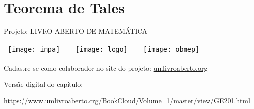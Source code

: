 \ifnum{}
\renewcommand\chapterillustration{abertura-tales}
\else
\renewcommand\chapterillustration{abertura-tales-professor}
\fi
\renewcommand\chapterwhat{São estudados o significado de um teorema
com sua hipótese e tese, o Teorema de Tales, sua recíproca, as projeções paralelas e aplicações.}
\renewcommand\chapterbecause{O capítulo contém uma ferramenta útil para resolver situações que envolvem retas paralelas. Além disso, o teorema de Tales será usado para para desenvolver o conceito de semelhança de triângulos, que é um dos instrumentos necessários para compreender o mundo real. A semelhança, por sua vez, permite a obtenção de diversas propriedades métricas das figuras geométricas, tanto planas como espaciais.}


\chapter{Teorema de Tales}



\mbox{}\thispagestyle{empty}\clearpage

\thispagestyle{empty}

\begin{center}
Projeto: LIVRO ABERTO DE MATEMÁTICA

\noindent \begin{tabular}{lcccr}
\texttt{[image: impa]}& \quad\quad& \texttt{[image: logo]} & \quad\quad& \texttt{[image: obmep]} 
\end{tabular}
\end{center}

\vspace*{.3cm}

Cadastre-se como colaborador no site do projeto: \url{umlivroaberto.org}

Versão digital do capítulo:

\url{https://www.umlivroaberto.org/BookCloud/Volume_1/master/view/GE201.html}


